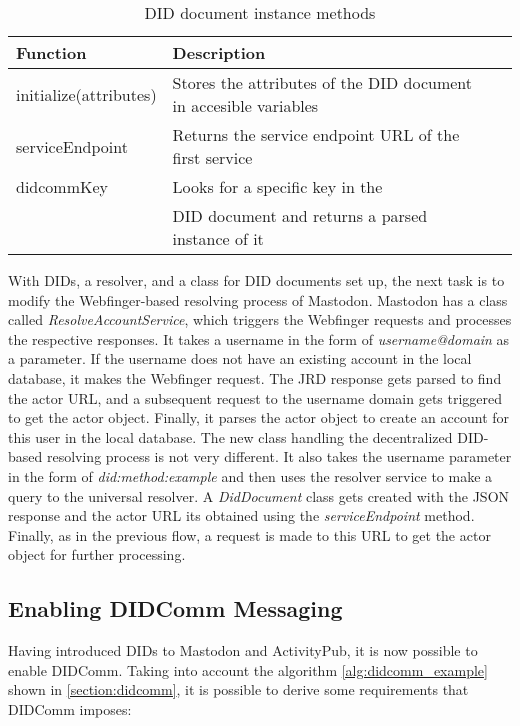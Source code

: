 \begin{table}[!ht]
	\centering
	\begin{tabular}{| l | l | l |}
		\hline
    Function & Description \\
		\hline
		\hline
      initialize(attributes) &  Stores the attributes of the DID document in accesible variables\\
    \hline
      serviceEndpoint & Returns the service endpoint URL of the first service \\
    \hline
      didcommKey & Looks for a specific key in the \\ & DID document and returns a parsed instance of it \\
    \hline
	\end{tabular}
	\caption{DID document instance methods}
  \label{table:did_doc_instance_methods}
\end{table}

With DIDs, a resolver, and a class for DID documents set up, the next task is to modify the Webfinger-based resolving process of Mastodon. Mastodon has a class called \emph{ResolveAccountService}, which triggers the Webfinger requests and processes the respective responses. It takes a username in the form of \emph{username@domain} as a parameter. If the username does not have an existing account in the local database, it makes the Webfinger request. The JRD response gets parsed to find the actor URL, and a subsequent request to the username domain gets triggered to get the actor object. Finally, it parses the actor object to create an account for this user in the local database.
The new class handling the decentralized DID-based resolving process is not very different. It also takes the username parameter in the form of \emph{did:method:example} and then uses the resolver service to make a query to the universal resolver. A \emph{DidDocument} class gets created with the JSON response and the actor URL its obtained using the \emph{serviceEndpoint} method. Finally, as in the previous flow, a request is made to this URL to get the actor object for further processing.

\subsection{Enabling DIDComm Messaging}\label{section:enabling_didcomm}

Having introduced DIDs to Mastodon and ActivityPub, it is now possible to enable DIDComm. Taking into account the algorithm \ref{alg:didcomm_example} shown in \autoref{section:didcomm}, it is possible to derive some requirements that DIDComm imposes:


